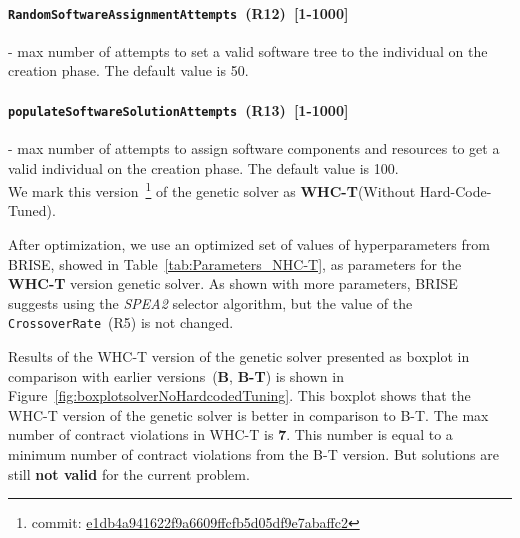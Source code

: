 \paragraph{\texttt{RandomSoftwareAssignmentAttempts}~(R12)~[1-1000]} - max number of attempts to set a valid software tree to the individual on the creation phase. The default value is 50.
\paragraph{\texttt{populateSoftwareSolutionAttempts}~(R13)~[1-1000]} -  max number of attempts to assign software components and resources to get a valid individual on the creation phase. The default value is 100.\\

We mark this version~\footnote{commit: \href{https://git-st.inf.tu-dresden.de/mquat/mquat2/commit/e1db4a941622f9a6609ffcfb5d05df9e7abaffc2}{e1db4a941622f9a6609ffcfb5d05df9e7abaffc2}} of the genetic solver as \textbf{WHC-T}(Without Hard-Code-Tuned).

After optimization, we use an optimized set of values of hyperparameters from BRISE, showed in Table~\ref{tab:Parameters_NHC-T}, as parameters for the \textbf{WHC-T} version genetic solver. As shown with more parameters, BRISE suggests using the \textit{SPEA2} selector algorithm, but the value of the \texttt{CrossoverRate}~(R5) is not changed.

\begin{table}
	\centering
	\caption{Parameters of WHC-T version of the genetic solver}\label{tab:Parameters_NHC-T}
\end{table}

Results of the WHC-T version of the genetic solver presented as boxplot in comparison with earlier versions~(\textbf{B}, \textbf{B-T}) is shown in Figure~\ref{fig:boxplotsolverNoHardcodedTuning}. This boxplot shows that the WHC-T version of the genetic solver is better in comparison to B-T. The max number of contract violations in WHC-T is \textbf{7}. This number is equal to a minimum number of contract violations from the B-T version. But solutions are still \textbf{not valid} for the current problem. 


